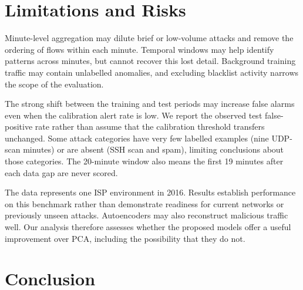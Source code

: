 \documentclass[conference]{IEEEtran}
\begin{document}

\section{Limitations and Risks}
Minute-level aggregation may dilute brief or low-volume attacks and remove the ordering of flows within each minute. Temporal windows may help identify patterns across minutes, but cannot recover this lost detail. Background training traffic may contain unlabelled anomalies, and excluding blacklist activity narrows the scope of the evaluation.

The strong shift between the training and test periods may increase false alarms even when the calibration alert rate is low. We report the observed test false-positive rate rather than assume that the calibration threshold transfers unchanged. Some attack categories have very few labelled examples (nine UDP-scan minutes) or are absent (SSH scan and spam), limiting conclusions about those categories. The 20-minute window also means the first 19 minutes after each data gap are never scored.

The data represents one ISP environment in 2016. Results establish performance on this benchmark rather than demonstrate readiness for current networks or previously unseen attacks. Autoencoders may also reconstruct malicious traffic well. Our analysis therefore assesses whether the proposed models offer a useful improvement over PCA, including the possibility that they do not.

\section{Conclusion}



\end{document}
